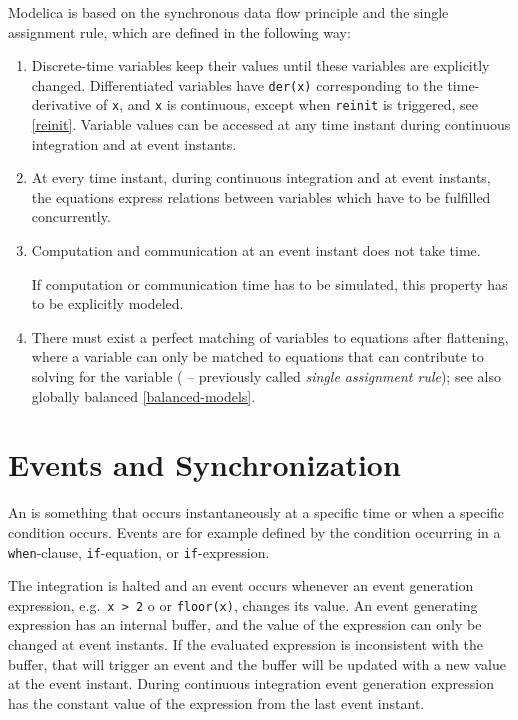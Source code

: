 Modelica is based on the synchronous data flow principle and the single
assignment rule, which are defined in the following way:
\begin{enumerate}
\item Discrete-time variables keep their values until these variables are explicitly changed.
Differentiated variables have \lstinline!der(x)! corresponding to the time-derivative of \lstinline!x!,
and \lstinline!x! is continuous, except when \lstinline!reinit! is triggered, see \cref{reinit}.
Variable values can be accessed at any time instant during continuous integration and at event instants.

\item At every time instant, during continuous integration and at event instants,
the equations express relations between variables which have to be fulfilled concurrently.

\item Computation and communication at an event instant does not take time.
\begin{nonnormative}
If computation or communication time has to be simulated, this property has to be explicitly modeled.
\end{nonnormative}

\item There must exist a perfect matching of variables to equations after flattening, where a variable can only
be matched to equations that can contribute to solving for the variable
( -- previously called \emph{single assignment rule}); see also globally balanced \cref{balanced-models}.
\end{enumerate}

\section{Events and Synchronization}\label{events-and-synchronization}

An  is something that occurs instantaneously at a specific time or when a specific condition occurs.
Events are for example defined by the condition occurring in a \lstinline!when!-clause, \lstinline!if!-equation, or \lstinline!if!-expression.

The integration is halted and an event occurs whenever an event
generation expression, e.g.\ \lstinline!x > 2! o or \lstinline!floor(x)!, changes
its value. An event generating expression has an internal buffer, and
the value of the expression can only be changed at event instants. If
the evaluated expression is inconsistent with the buffer, that will
trigger an event and the buffer will be updated with a new value at the
event instant. During continuous integration event generation expression
has the constant value of the expression from the last event instant.

